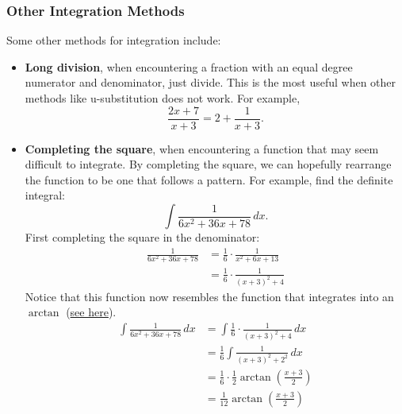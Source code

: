 \documentclass[12pt]{article}
\begin{document}
            \subsubsection{Other Integration Methods}
                Some other methods for integration include:
                \begin{itemize}
                    \item \textbf{Long division}, when encountering a fraction with an equal degree numerator and denominator, just divide. This is the most useful when other methods like u-substitution does not work. For example,
                    \[ \frac{2x+7}{x+3} = 2 + \frac{1}{x+3}. \]
                    \item \textbf{Completing the square}, when encountering a function that may seem difficult to integrate. By completing the square, we can hopefully rearrange the function to be one that follows a pattern. For example, find the definite integral:
                    \[ \int \frac{1}{6x^2+36x+78} \, dx. \]
                    First completing the square in the denominator:
                    \begin{align*}
                        \frac{1}{6x^2+36x+78} &= \frac{1}{6} \cdot \frac{1}{x^2+6x+13} \\[6pt]
                        &= \frac{1}{6} \cdot \frac{1}{(x+3)^2 + 4}
                    \end{align*}
                    Notice that this function now resembles the function that integrates into an $\arctan$ (\hyperref[sec:arctanintegral]{see here}).
                    \begin{align*}
                        \int \frac{1}{6x^2+36x+78} \, dx &= \int \frac{1}{6} \cdot \frac{1}{(x+3)^2 + 4} \, dx \\[6pt]
                        &= \frac{1}{6} \int \frac{1}{(x+3)^2 + 2^2} \, dx\\[6pt]
                        &= \frac{1}{6} \cdot \frac{1}{2} \arctan \left( \frac{x+3}{2} \right) \\[6pt]
                        &= \frac{1}{12} \arctan \left( \frac{x+3}{2} \right)
                    \end{align*}
                \end{itemize}
\end{document}
